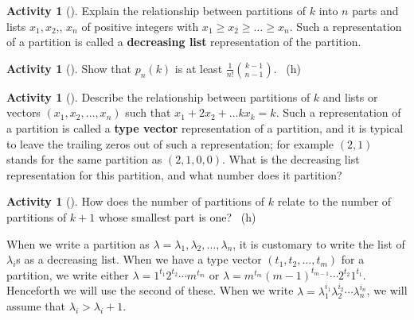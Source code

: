 \documentclass[10pt,]{book}
\newcommand{\terminology}[1]{\textbf{#1}}
\theoremstyle{plain}
\theoremstyle{definition}
\theoremstyle{definition}
\theoremstyle{definition}
\newtheorem{activity}[project]{Activity}
\numberwithin{equation}{chapter}
\begin{document}
\begin{activity}[]\label{activity-203}
\hypertarget{p-1128}{}%
Explain the relationship between partitions of \(k\) into \(n\) parts and lists \(x_1,x_2\),\textellipsis{}, \(x_n\) of positive integers with \(x_1\ge x_2\ge\ldots \ge x_n\). Such a representation of a partition is called a \terminology{decreasing list} representation of the partition.%
\end{activity}
\begin{activity}[]\label{activity-204}
\hypertarget{p-1130}{}%
Show that \(p_n(k)\) is at least \(\frac{1}{n!}\binom{k-1}{n-1}\).%
~{\tiny (h)}\end{activity}
\begin{activity}[]\label{activity-205}
\hypertarget{p-1133}{}%
Describe the relationship between partitions of \(k\) and lists or vectors \((x_1,x_2,\ldots,x_n)\) such that \(x_1+2x_2+\ldots kx_k = k\).  Such a representation of a partition is called a \terminology{type vector} representation of a partition, and it is typical to leave the trailing zeros out of such a representation; for example \((2,1)\) stands for the same partition as \((2,1,0,0)\). What is the decreasing list representation for this partition, and what number does it partition?%
\end{activity}
\begin{activity}[]\label{activity-206}
\hypertarget{p-1135}{}%
How does the number of partitions of \(k\) relate to the number of partitions of \(k+1\) whose smallest part is one?%
~{\tiny (h)}\end{activity}
\hypertarget{p-1138}{}%
When we write a partition as \(\lambda = \lambda_1,\lambda_2,\ldots,\lambda_n\), it is customary to write the list of \(\lambda_i\)s as a decreasing list. When we have a type vector \((t_1,t_2,\ldots,t_m)\) for a partition, we write either \(\lambda = 1^{t_1}2^{t_2}\cdots m^{t_m}\) or \(\lambda = m^{t_m}(m-1)^{t_{m-1}}\cdots 2^{t_2}1^{t_1}\). Henceforth we will use the second of these. When we write \(\lambda=\lambda_1^{i_1}\lambda_2^{i_2}\cdots\lambda_n^{i_n}\), we will assume that \(\lambda_i>\lambda_i+1\).%
\par
\hypertarget{p-1139}{}%
\end{document}
